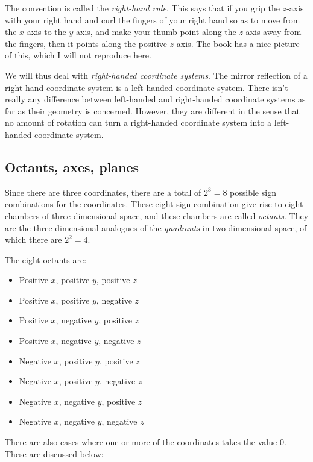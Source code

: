 \documentclass[10pt]{amsart}
\begin{document}
The convention is called the {\em right-hand rule}. This says that if
you grip the $z$-axis with your right hand and curl the fingers of
your right hand so as to move from the $x$-axis to the $y$-axis, and
make your thumb point along the $z$-axis away from the fingers, then
it points along the positive $z$-axis. The book has a nice picture of
this, which I will not reproduce here.

We will thus deal with {\em right-handed coordinate systems}. The
mirror reflection of a right-hand coordinate system is a left-handed
coordinate system. There isn't really any difference between
left-handed and right-handed coordinate systems as far as their
geometry is concerned. However, they are different in the sense that
no amount of rotation can turn a right-handed coordinate system into a
left-handed coordinate system.

\subsection{Octants, axes, planes}

Since there are three coordinates, there are a total of $2^3 = 8$
possible sign combinations for the coordinates. These eight sign
combination give rise to eight chambers of three-dimensional space,
and these chambers are called {\em octants}. They are the
three-dimensional analogues of the {\em quadrants} in two-dimensional
space, of which there are $2^2 = 4$.

The eight octants are:

\begin{itemize}
\item Positive $x$, positive $y$, positive $z$
\item Positive $x$, positive $y$, negative $z$
\item Positive $x$, negative $y$, positive $z$
\item Positive $x$, negative $y$, negative $z$
\item Negative $x$, positive $y$, positive $z$
\item Negative $x$, positive $y$, negative $z$
\item Negative $x$, negative $y$, positive $z$
\item Negative $x$, negative $y$, negative $z$
\end{itemize}

There are also cases where one or more of the coordinates takes the
value $0$. These are discussed below:
\end{document}
